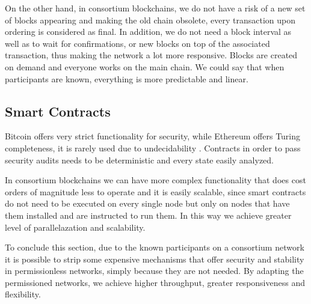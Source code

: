 On the other hand, in consortium blockchains, we do not have a risk of a new set of blocks appearing and making the old chain obsolete, every transaction upon ordering is considered as final. In addition, we do not need a block interval as well as to wait for confirmations, or new blocks on top of the associated transaction, thus making the network a lot more responsive. Blocks are created on demand and everyone works on the main chain. We could say that when participants are known, everything is more predictable and linear.



\subsection{Smart Contracts}
Bitcoin offers very strict functionality for security, while Ethereum offers Turing completeness, it is rarely used due to undecidability \cite{miller-turing}. Contracts in order to pass security audits needs to be deterministic and every state easily analyzed. 

In consortium blockchains we can have more complex functionality that does cost orders of magnitude less to operate and it is easily scalable, since  smart contracts do not need to be executed on every single node but only on nodes that have them installed and are instructed to run them. In this way we achieve greater level of parallelazation and scalability.

To conclude this section, due to the known participants on a consortium network it is possible to strip some expensive mechanisms that offer security and stability in permissionless networks, simply because they are not needed. By adapting the permissioned networks, we achieve higher throughput, greater responsiveness and flexibility. 